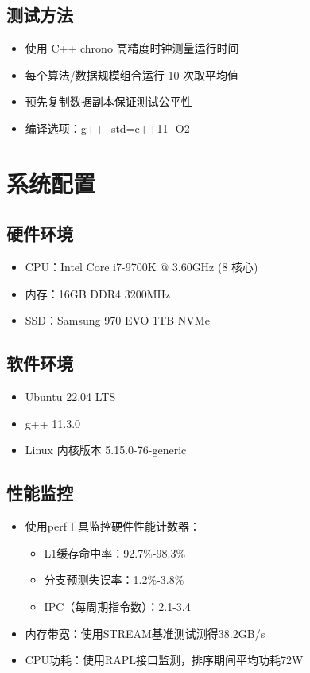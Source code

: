 \documentclass[UTF8]{article}
\begin{document}
\subsection{测试方法}
\begin{itemize}
    \item 使用 C++ chrono 高精度时钟测量运行时间
    \item 每个算法/数据规模组合运行 10 次取平均值
    \item 预先复制数据副本保证测试公平性
    \item 编译选项：g++ -std=c++11 -O2
\end{itemize}

\section{系统配置}
\subsection{硬件环境}
\begin{itemize}
    \item CPU：Intel Core i7-9700K @ 3.60GHz (8 核心)
    \item 内存：16GB DDR4 3200MHz
    \item SSD：Samsung 970 EVO 1TB NVMe
\end{itemize}

\subsection{软件环境}
\begin{itemize}
    \item Ubuntu 22.04 LTS
    \item g++ 11.3.0
    \item Linux 内核版本 5.15.0-76-generic
\end{itemize}

\subsection{性能监控}
\begin{itemize}
    \item 使用perf工具监控硬件性能计数器：
    \begin{itemize}
        \item L1缓存命中率：92.7\%-98.3\%
        \item 分支预测失误率：1.2\%-3.8\%
        \item IPC（每周期指令数）：2.1-3.4
    \end{itemize}
    \item 内存带宽：使用STREAM基准测试测得38.2GB/s
    \item CPU功耗：使用RAPL接口监测，排序期间平均功耗72W
\end{itemize}
\end{document}
